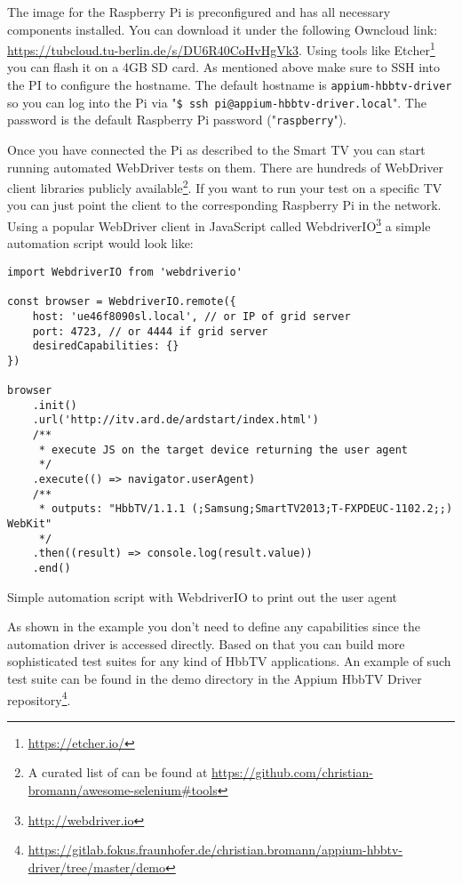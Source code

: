 The image for the Raspberry Pi is preconfigured and has all necessary components installed. You can download it under the following Owncloud link: \url{https://tubcloud.tu-berlin.de/s/DU6R40CoHvHgVk3}. Using tools like Etcher\footnote{\url{https://etcher.io/}} you can flash it on a 4GB SD card. As mentioned above make sure to SSH into the PI to configure the hostname. The default hostname is \texttt{appium-hbbtv-driver} so you can log into the Pi via "\texttt{\$ ssh pi@appium-hbbtv-driver.local}". The password is the default Raspberry Pi password ("\texttt{raspberry}").

Once you have connected the Pi as described to the Smart TV you can start running automated WebDriver tests on them. There are hundreds of WebDriver client libraries publicly available\footnote{A curated list of can be found at \url{https://github.com/christian-bromann/awesome-selenium\#tools}}. If you want to run your test on a specific TV you can just point the client to the corresponding Raspberry Pi in the network. Using a popular WebDriver client in JavaScript called WebdriverIO\footnote{\url{http://webdriver.io}} a simple automation script would look like:

\begin{listing}[H]
\begin{verbatim}
import WebdriverIO from 'webdriverio'

const browser = WebdriverIO.remote({
    host: 'ue46f8090sl.local', // or IP of grid server
    port: 4723, // or 4444 if grid server
    desiredCapabilities: {}
})

browser
    .init()
    .url('http://itv.ard.de/ardstart/index.html')
    /**
     * execute JS on the target device returning the user agent
     */
    .execute(() => navigator.userAgent)
    /**
     * outputs: "HbbTV/1.1.1 (;Samsung;SmartTV2013;T-FXPDEUC-1102.2;;) WebKit"
     */
    .then((result) => console.log(result.value))
    .end()
\end{verbatim}
\caption{Simple automation script with WebdriverIO to print out the user agent}
\label{lst:wdioExample}
\end{listing}

As shown in the example you don't need to define any capabilities since the automation driver is accessed directly. Based on that you can build more sophisticated test suites for any kind of HbbTV applications. An example of such test suite can be found in the demo directory in the Appium HbbTV Driver repository\footnote{\url{https://gitlab.fokus.fraunhofer.de/christian.bromann/appium-hbbtv-driver/tree/master/demo}}.

